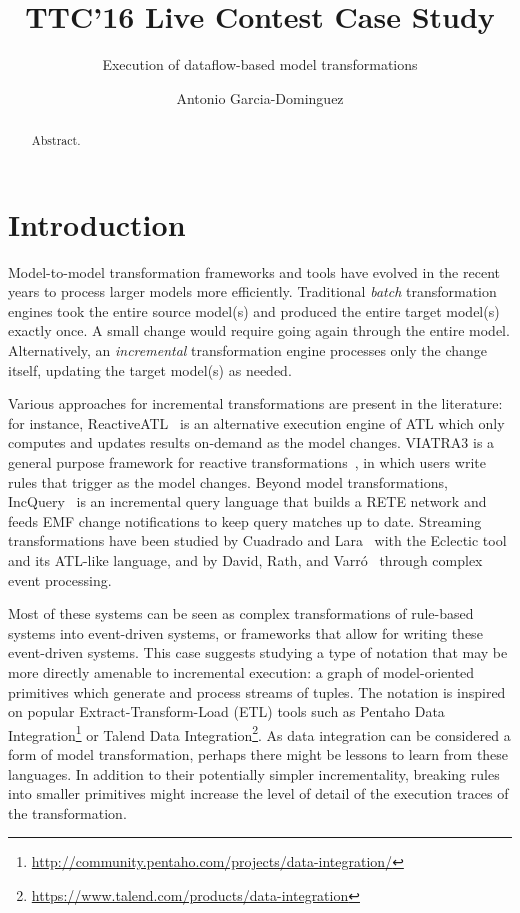 \documentclass[a4paper]{scrartcl}
\title{TTC'16 Live Contest Case Study}
\subtitle{Execution of dataflow-based model transformations}
\author{Antonio Garcia-Dominguez}
\affil{\small Aston University, Birmingham, UK \\ \texttt{a.garcia-dominguez@aston.ac.uk}}
\date{}
\begin{document}
\maketitle

\begin{abstract}
  Abstract.
\end{abstract}

\section{Introduction}
\label{sec:intro}

Model-to-model transformation frameworks and tools have evolved in the
recent years to process larger models more efficiently. Traditional
\emph{batch} transformation engines took the entire source model(s)
and produced the entire target model(s) exactly once. A small change
would require going again through the entire model. Alternatively, an
\emph{incremental} transformation engine processes only the change
itself, updating the target model(s) as needed.

Various approaches for incremental transformations are present in the
literature: for instance, ReactiveATL~\cite{tisi_lazy_2011} is an
alternative execution engine of ATL which only computes and updates
results on-demand as the model changes. VIATRA3 is a general purpose
framework for reactive transformations~\cite{bergmann_viatra_2015}, in
which users write rules that trigger as the model changes. Beyond
model transformations, IncQuery~\cite{bergmann_incremental_2010} is an
incremental query language that builds a RETE network and feeds EMF
change notifications to keep query matches up to date. Streaming
transformations have been studied by Cuadrado and
Lara~\cite{cuadrado_streaming_2013} with the Eclectic tool and its
ATL-like language, and by David, Rath, and
Varró~\cite{david_streaming_2014} through complex event processing.

Most of these systems can be seen as complex transformations of
rule-based systems into event-driven systems, or frameworks that allow
for writing these event-driven systems. This case suggests studying a
type of notation that may be more directly amenable to incremental
execution: a graph of model-oriented primitives which generate and
process streams of tuples. The notation is inspired on popular
Extract-Transform-Load (ETL) tools such as Pentaho Data
Integration\footnote{\url{http://community.pentaho.com/projects/data-integration/}}
or Talend Data
Integration\footnote{\url{https://www.talend.com/products/data-integration}}. As
data integration can be considered a form of model transformation,
perhaps there might be lessons to learn from these languages. In
addition to their potentially simpler incrementality, breaking rules
into smaller primitives might increase the level of detail of the
execution traces of the transformation.
\end{document}
